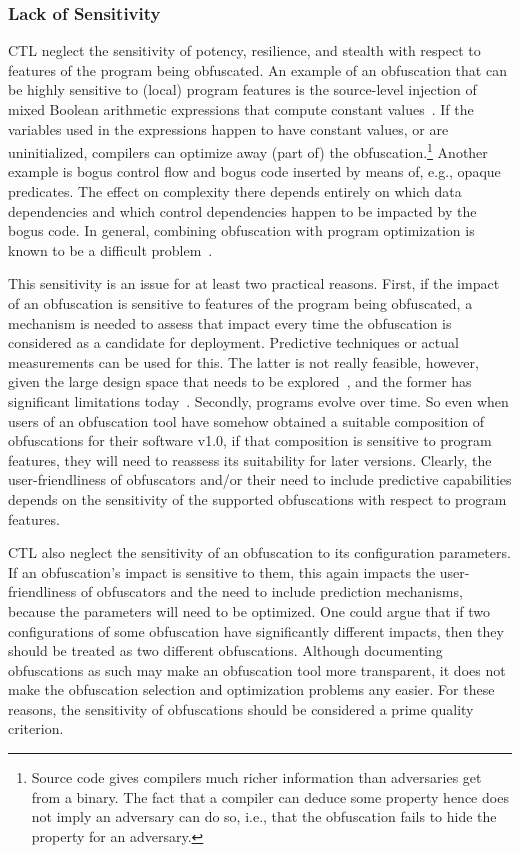 \subsubsection{Lack of Sensitivity}
\label{sec:sensitivity_missing}
CTL neglect the sensitivity of potency, resilience, and stealth with respect to features of the program being obfuscated. An example of an obfuscation that can be highly sensitive to (local) program features is the source-level injection of mixed Boolean arithmetic expressions that compute constant values~\cite{mba}. If the variables used in the expressions happen to have constant values, or are uninitialized, compilers can optimize away (part of) the obfuscation.\footnote{%
Source code gives compilers much richer information than adversaries get from a binary. The fact that a compiler can deduce some property hence does not imply an adversary can do so, i.e., that the obfuscation fails to hide the property for an adversary.} Another example is bogus control flow and bogus code inserted by means of, e.g., opaque predicates. The effect on complexity there depends entirely on which data dependencies and which control dependencies happen to be impacted by the bogus code. In general, combining obfuscation with program optimization is known to be a difficult problem~\cite{optimization}.

This sensitivity is an issue for at least two practical reasons. First, if the impact of an obfuscation is sensitive to features of the program being obfuscated, a mechanism is needed to assess that impact every time the obfuscation is considered as a candidate for deployment. Predictive techniques or actual measurements can be used for this. The latter is not really feasible, however, given the large design space that needs to be explored~\cite{Basile23}, and the former has significant limitations today~\cite{reganoMetric}. Secondly, programs evolve over time. So even when users of an obfuscation tool have somehow obtained a suitable composition of obfuscations for their software v1.0, if that composition is sensitive to program features, they will need to reassess its suitability for later versions. Clearly, the user-friendliness of obfuscators and/or their need to include predictive capabilities depends on the sensitivity of the supported obfuscations with respect to program features. 

CTL also neglect the sensitivity of an obfuscation to its configuration parameters. If an obfuscation's impact is sensitive to them, this again impacts the user-friendliness of obfuscators and the need to include prediction mechanisms, because the parameters will need to be optimized. One could argue that if two configurations of some obfuscation have significantly different impacts, then they should be treated as two different obfuscations. Although documenting obfuscations as such may make an obfuscation tool more transparent, it does not make the obfuscation selection and optimization problems any easier. For these reasons, the sensitivity of obfuscations should be considered a prime quality criterion. 

